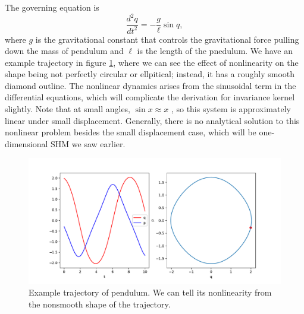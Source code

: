 \documentclass{statsmsc}
\begin{document}
The governing equation is 
$$
\frac{d^2q}{dt^2}=-\frac{g}{\ell}\sin q, 
$$
where $g$ is the gravitational constant that controls the gravitational force pulling down the mass of pendulum and $\ell$ is the length of the pnedulum.
We have an example trajectory in figure \ref{fig:pendulum_trajectory}, where we can see the effect of nonlinearity on the shape being not perfectly circular or ellpitical; instead, it has a roughly smooth diamond outline. 
The nonlinear dynamics arises from the sinusoidal term in the differential equations, which will complicate the derivation for invariance kernel slightly. 
Note that at small angles, $\sin x \approx x$ , so this system is approximately linear under small displacement. 
Generally, there is no analytical solution to this nonlinear problem besides the small displacement case, which will be one-dimensional SHM we saw earlier.

\begin{figure}[H] 
  \includegraphics[width=0.7\linewidth]{../codes/figures/pendulum_trajectory_1D.pdf}
  \centering
  \caption{Example trajectory of pendulum. We can tell its nonlinearity from the nonsmooth shape of the trajectory.}
  \label{fig:pendulum_trajectory}
\end{figure}
\end{document}

